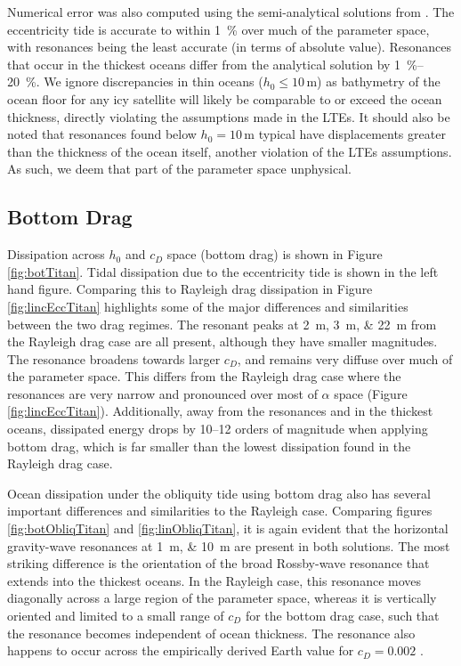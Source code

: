 Numerical error was also computed using the semi-analytical solutions from \citep{matsuyama2014tidal}. The eccentricity tide is accurate to within \SI{1}{\percent} over much of the parameter space, with resonances being the least accurate (in terms of absolute value). Resonances that occur in the thickest oceans differ from the analytical solution by \SIrange{1}{20}{\percent}. We ignore discrepancies in thin oceans ($h_0 \leq 10 \, \si{\metre}$) as bathymetry of the ocean floor for any icy satellite will likely be comparable to or exceed the ocean thickness, directly violating the assumptions made in the LTEs. It should also be noted that resonances found below $h_0 = 10 \, \si{\metre}$ typical have displacements greater than the thickness of the ocean itself, another violation of the LTEs assumptions. As such, we deem that part of the parameter space unphysical.

\subsection{Bottom Drag \label{subsec:botTitan}}

Dissipation across $h_0$ and $c_D$ space (bottom drag) is shown in Figure \ref{fig:botTitan}. Tidal dissipation due to the eccentricity tide is shown in the left hand figure. Comparing this to Rayleigh drag dissipation in Figure \ref{fig:lincEccTitan} highlights some of the major differences and similarities between the two drag regimes. The resonant peaks at \SIlist{2;3;22}{\metre} from the Rayleigh drag case are all present, although they have smaller magnitudes. The resonance broadens towards larger $c_D$, and remains very diffuse over much of the parameter space. This differs from the Rayleigh drag case where the resonances are very narrow and pronounced over most of $\alpha$ space (Figure \ref{fig:lincEccTitan}). Additionally, away from the resonances and in the thickest oceans, dissipated energy drops by \numrange{10}{12} orders of magnitude when applying bottom drag, which is far smaller than the lowest dissipation found in the Rayleigh drag case.  

Ocean dissipation under the obliquity tide using bottom drag also has several important differences and similarities to the Rayleigh case. Comparing figures \ref{fig:botObliqTitan} and \ref{fig:linObliqTitan}, it is again evident that the horizontal gravity-wave resonances at \SIlist{1;10}{\metre} are present in both solutions. The most striking difference is the orientation of the broad Rossby-wave resonance that extends into the thickest oceans. In the Rayleigh case, this resonance moves diagonally across a large region of the parameter space, whereas it is vertically oriented and limited to a small range of $c_D$ for the bottom drag case, such that the resonance becomes independent of ocean thickness. The resonance also happens to occur across the empirically derived Earth value for $c_D = 0.002$ \citep[e.g.,][]{sohl1995tidal,egbert2001estimates}. 

